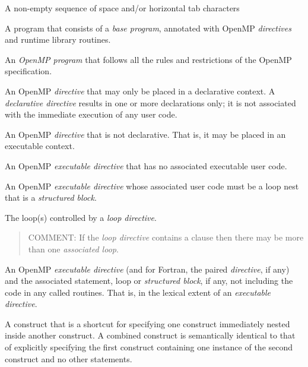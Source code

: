 \glossarydefstart
A non-empty sequence of space and/or horizontal tab characters
\glossarydefend

\glossarydefstart
A program that consists of a \emph{base program}, annotated with OpenMP \emph{directives} and 
runtime library routines.
\glossarydefend

\glossarydefstart
An \emph{OpenMP program} that follows all the rules and restrictions of the OpenMP 
specification.
\glossarydefend

\glossarydefstart
An OpenMP \emph{directive} that may only be placed in a declarative context. A 
\emph{declarative directive} results in one or more declarations only; it is not associated 
with the immediate execution of any user code.
\glossarydefend

\glossarydefstart
An OpenMP \emph{directive} that is not declarative. That is, it may be placed in an 
executable context.
\glossarydefend

\glossarydefstart
An OpenMP \emph{executable directive} that has no associated executable user code.
\glossarydefend

\glossarydefstart
An OpenMP \emph{executable directive} whose associated user code must be a loop nest 
that is a \emph{structured block}.
\glossarydefend

\glossarydefstart
The loop(s) controlled by a \emph{loop directive}.

\begin{quote}
COMMENT: If the \emph{loop directive} contains a  clause then there may be 
more than one \emph{associated loop}.
\end{quote}
\glossarydefend

\glossarydefstart
An OpenMP \emph{executable directive} (and for Fortran, the paired  \emph{directive}, if 
any) and the associated statement, loop or \emph{structured block}, if any, not including 
the code in any called routines. That is, in the lexical extent of an \emph{executable 
directive}.
\glossarydefend

\glossarydefstart
A construct that is a shortcut for specifying one construct immediately nested inside another construct. A combined construct is semantically identical to that of explicitly specifying the first construct containing one instance of the second construct and no other statements.
\glossarydefend

